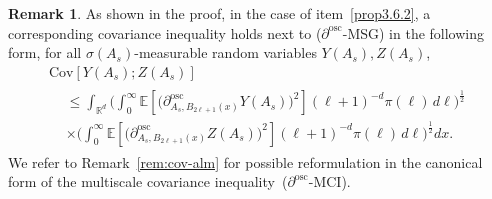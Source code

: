 \documentclass[10pt]{amsart}
\theoremstyle{definition}\newtheorem{defi}[theo]{Definition}\newtheorem{rema}[theo]{Remark}\newtheorem{exam}[theo]{Example}\newtheorem{exem}[theo]{Example}\newtheorem{nota}[theo]{Notation}
\newcommand{\R}{\mathbb R}
\newcommand{\expec}[1]{\mathbb{E}\left[#1 \right]}
\newcommand{\osc}{\partial^{\mathrm{osc}}}
\newcommand{\oscd}[1]{\mathrel{\osc_{#1}}}
\newcommand{\cov}[2]{\mathrm{Cov}\left[#1;#2\right]}
\begin{document}
\begin{rema}
As shown in the proof, in the case of item~\eqref{prop3.6.2}, a corresponding covariance inequality holds next to ($\osc$-MSG) in the following form, for all $\sigma(A_s)$-measurable random variables $Y(A_s),Z(A_s)$,
\begin{multline}\label{eq:MSG-RPM}
\cov{Y(A_s)}{Z(A_s)}\\
\begin{aligned}
&\le \int_{\R^d}\bigg(\int_0^\infty\expec{\Big(\oscd{A_s,B_{2\ell+1}(x)}Y(A_s)\Big)^2}(\ell+1)^{-d}\pi(\ell)\,d\ell\bigg)^\frac12\\
&\times\bigg(\int_0^\infty\expec{\Big(\oscd{A_s,B_{2\ell+1}(x)}Z(A_s)\Big)^2}(\ell+1)^{-d}\pi(\ell)\,d\ell\bigg)^\frac12dx.
\end{aligned}
\end{multline}
We refer to Remark~\ref{rem:cov-alm} for possible reformulation in the canonical form of the multiscale covariance inequality~($\osc$-MCI).
\end{rema}
\end{document}
